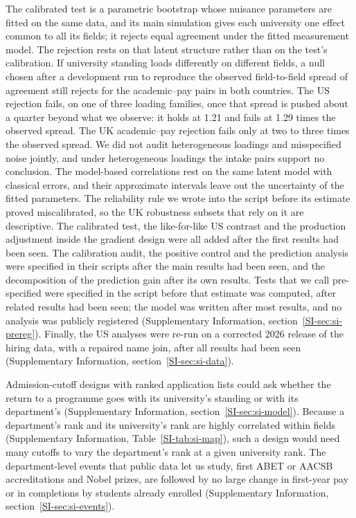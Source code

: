 \documentclass[11pt]{article}
\newcommand{\SIsec}[1]{Supplementary Information, section~\ref{SI-#1}}
\newcommand{\SItab}[1]{Supplementary Information, Table~\ref{SI-#1}}
\begin{document}
The calibrated test is a parametric bootstrap whose nuisance parameters are fitted on the same data, and its main
simulation gives each university one effect common to all its fields; it rejects equal agreement under the fitted
measurement model. The rejection rests on that latent structure rather than on the test's calibration. If university
standing loads differently on different fields, a null chosen after a development run to reproduce the observed
field-to-field spread of agreement still rejects for the academic--pay pairs in both countries. The US rejection fails,
on one of three loading families, once that spread is pushed about a quarter beyond what we observe: it holds at 1.21
and fails at 1.29 times the observed spread. The UK academic--pay rejection fails only at two to three times the
observed spread. We did not audit heterogeneous loadings and misspecified noise jointly, and under heterogeneous
loadings the intake pairs support no conclusion. The model-based correlations rest on the same latent model with classical errors, and their
approximate intervals leave out the uncertainty of the fitted parameters. The reliability rule we wrote into the script
before its estimate proved miscalibrated, so the UK robustness subsets that rely on it are descriptive. The calibrated test,
the like-for-like US contrast and the production adjustment inside the gradient design were all added after the first
results had been seen. The calibration audit, the positive control and the prediction analysis were specified in
their scripts after the main results had been seen, and the decomposition of the prediction gain after its own
results. Tests that we call pre-specified were specified in the script before that estimate was
computed, after related results had been seen; the model was written after most results, and no analysis was publicly
registered (\SIsec{sec:si-prereg}). Finally, the US analyses were re-run on a corrected 2026 release of the hiring
data, with a repaired name join, after all results had been seen (\SIsec{sec:si-data}).

Admission-cutoff designs with ranked application lists \citep{kirkeboen2016field, avery2013revealed} could ask
whether the return to a programme goes with its university's standing or with its department's
(\SIsec{sec:si-model}). Because a department's rank and its university's rank are highly correlated within fields
(\SItab{tab:si-map}), such a design would need many cutoffs to vary the department's rank at a given university rank.
The department-level events that public data let us study, first ABET or AACSB accreditations and Nobel prizes, are
followed by no large change in first-year pay or in completions by students already enrolled
(\SIsec{sec:si-events}).
\end{document}
